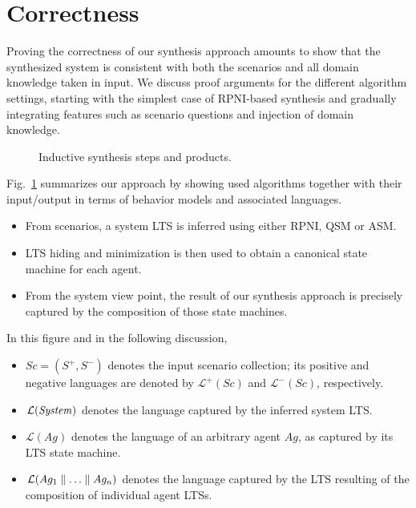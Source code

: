 \section{Correctness\label{section:inductive-correctness}}

Proving the correctness of our synthesis approach amounts to show that the synthesized system is consistent with both the scenarios and all domain knowledge taken in input. We discuss proof arguments for the different algorithm settings, starting with the simplest case of RPNI-based synthesis and gradually integrating features such as scenario questions and injection of domain knowledge.

\begin{figure}\centering
{}
\caption{Inductive synthesis steps and products.\label{figure:synthesis-flow-model}} 
\end{figure}

Fig.~\ref{figure:synthesis-flow-model} summarizes our approach by showing used algorithms together with their input/output in terms of behavior models and associated languages. 
\begin{itemize}
\item From scenarios, a system LTS is inferred using either RPNI, QSM or ASM. 
\item LTS hiding and minimization is then used to obtain a canonical state machine for each agent. 
\item From the system view point, the result of our synthesis approach is precisely captured by the composition of those state machines.
\end{itemize}

In this figure and in the following discussion,
\begin{itemize}
\item $Sc = (S^+,S^-)$ denotes the input scenario collection; its positive and negative languages are denoted by $\mathcal{L}^+(Sc)$ and $\mathcal{L}^-(Sc)$, respectively.
\item $\mathcal{L}(\mbox{\emph{System}})$ denotes the language captured by the inferred system LTS.
\item $\mathcal{L}(Ag)$ denotes the language of an arbitrary agent $Ag$, as captured by its LTS state machine.
\item $\mathcal{L}(Ag_1 \parallel \ldots \parallel Ag_n)$ denotes the language captured by the LTS resulting of the composition of individual agent LTSs.
\end{itemize}

